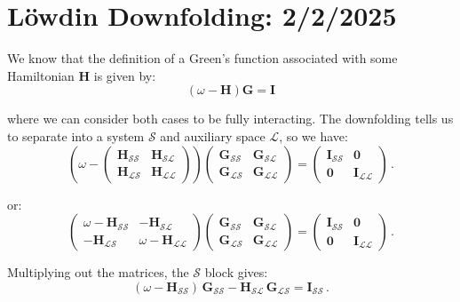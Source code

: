 \section{Löwdin Downfolding: 2/2/2025}

We know that the definition of a Green's function associated with some Hamiltonian $\bm{H}$ is given by:
\begin{equation}
    \left(\omega - \bm{H}\right)\bm{G} = \bm{I}
    \label{eqn:resolvent}
\end{equation}

where we can consider both cases to be fully interacting. The downfolding tells us to separate into a system $\mathcal{S}$ and auxiliary space $\mathcal{L}$, so we have:
\[
\left(\omega - \begin{pmatrix}
\bm{H}_{\mathcal{SS}} & \bm{H}_{\mathcal{SL}} \\
\bm{H}_{\mathcal{LS}} & \bm{H}_{\mathcal{LL}}
\end{pmatrix}\right)
\begin{pmatrix}
\bm{G}_{\mathcal{SS}} & \bm{G}_{\mathcal{SL}} \\
\bm{G}_{\mathcal{LS}} & \bm{G}_{\mathcal{LL}}
\end{pmatrix}
=
\begin{pmatrix}
\bm{I}_{\mathcal{SS}} & \bm{0} \\
\bm{0} & \bm{I}_{\mathcal{LL}}
\end{pmatrix}\,.
\]

or:
\[
\begin{pmatrix}
\omega - \bm{H}_{\mathcal{SS}} & -\bm{H}_{\mathcal{SL}} \\
-\bm{H}_{\mathcal{LS}} & \omega - \bm{H}_{\mathcal{LL}}
\end{pmatrix}
\begin{pmatrix}
\bm{G}_{\mathcal{SS}} & \bm{G}_{\mathcal{SL}} \\
\bm{G}_{\mathcal{LS}} & \bm{G}_{\mathcal{LL}}
\end{pmatrix}
=
\begin{pmatrix}
\bm{I}_{\mathcal{SS}} & \bm{0} \\
\bm{0} & \bm{I}_{\mathcal{LL}}
\end{pmatrix}\,.
\]

Multiplying out the matrices, the $\mathcal{S}$ block gives:
\begin{equation}
(\omega - \bm{H}_{\mathcal{SS}})\,\bm{G}_{\mathcal{SS}} - \bm{H}_{\mathcal{SL}}\,\bm{G}_{\mathcal{LS}} = \bm{I}_{\mathcal{SS}}\,.
\end{equation}

